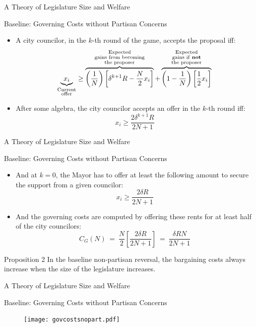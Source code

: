 \documentclass[11pt]{beamer}
\begin{document}
\begin{frame}{A Theory of Legislature Size and Welfare}
\begin{block}{Baseline: Governing Costs without Partisan Concerns}
\begin{itemize} 
  \item A city councilor, in the $k$-th round of the game, accepts the proposal iff:
  \[
    \underbrace{x_i}_{\substack{\text{Current} \\ \text{offer}}} \geq \overbrace{\left(\dfrac{1}{N} \right)\left[ \delta^{k+1}R - \dfrac{N}{2}x_i \right]}^{\substack{\text{Expected} \\ \text{gains from becoming} \\ \text{the proposer}}} + \overbrace{\left( 1 - \dfrac{1}{N} \right)\left[\dfrac{1}{2} x_i \right]}^{\substack{\text{Expected} \\ \text{gains if \textbf{not}} \\ \text{the proposer}}}
 \]
 \item After some algebra, the city councilor accepts an offer in the $k$-th round iff:
 \[
  x_i \geq \dfrac{2 \delta^{k+1}R}{2N + 1}
 \]
\end{itemize}
\end{block}

\end{frame}

\begin{frame}{A Theory of Legislature Size and Welfare}
\begin{block}{Baseline: Governing Costs without Partisan Concerns}
\begin{itemize} 
  \item And at $k=0$, the Mayor has to offer at least the following amount to secure the support from a given councilor:
  \[
   x_i \geq \dfrac{2 \delta R}{2N + 1}
  \]
  \item And the governing costs are computed by offering these rents for at least half of the city councilors:
  \[
    C_G(N) \ = \ \dfrac{N}{2}\left[\dfrac{2 \delta R }{2N + 1}\right] \ = \ \dfrac{\delta R N}{2N + 1}
  \]
 \end{itemize}
 \end{block}
 \pause
 \begin{block}{Proposition 2}
   In the baseline non-partisan reversal, the bargaining costs always increase when the size of the legislature increases.
 \end{block}
\end{frame}

\begin{frame}{A Theory of Legislature Size and Welfare}
  \begin{block}{Baseline: Governing Costs without Partisan Concerns}
    \begin{figure}[htb]
      \centering
      \texttt{[image: govcostsnopart.pdf]}
    \end{figure}
  \end{block}
\end{frame}
\end{document}
